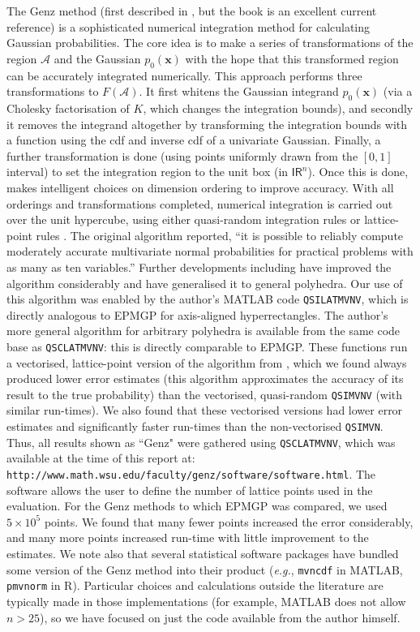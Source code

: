 \documentclass[twoside,11pt]{article}
\def\x{{\mathbf x}}
\def\regionA{\mathcal{A}}
\newcommand{\reals}{\mathsf{I\!R}}
\begin{document}
The Genz method (first described in \cite{genz92}, but the book \cite{genzBook} is an excellent current reference) is a sophisticated numerical integration
method for calculating Gaussian probabilities.
The core idea is to make a series of transformations of the region $\regionA$ and the Gaussian
$p_0(\x)$ with the hope that this transformed region can be accurately
integrated numerically. This approach performs three
transformations to $F(\regionA)$.  It first 
whitens the Gaussian integrand $p_0(\x)$ (via a Cholesky factorisation of
$K$, which changes the
integration bounds), and secondly it removes the integrand
altogether by transforming the integration bounds with a function
using the cdf and inverse cdf of a
univariate Gaussian.  Finally, a further transformation is done
(using points uniformly drawn from the $[0,1]$ interval) to
set the integration region to the unit box (in $\reals^n$).  Once this is
done, \cite{genz92} makes intelligent choices on dimension ordering
to improve accuracy.  With all orderings and
transformations completed, numerical integration is
carried out over the unit hypercube, using either quasi-random integration
rules \cite[]{nieder72,cranley76} or lattice-point rules
\cite[]{cranley76, nuyens04}.   The original algorithm
\cite[]{genz92} reported, ``it is possible to reliably compute
moderately accurate multivariate normal probabilities for practical
problems with as many as ten variables.'' Further developments
including \cite[]{genz99, genz99b, genz02, genz04} have improved the
algorithm considerably and have generalised it to general polyhedra.
Our use of this algorithm was enabled by the author's MATLAB code
{\tt QSILATMVNV}, which is directly analogous to EPMGP for axis-aligned hyperrectangles.  The author's more general algorithm for arbitrary polyhedra is available from the same code base as {\tt QSCLATMVNV}: this is directly comparable to EPMGP.  These functions run a vectorised,
lattice-point version of the algorithm from \cite[]{genz92}, which we found always
produced lower error estimates (this algorithm approximates the
accuracy of its result to the true probability) than the vectorised, quasi-random
{\tt QSIMVNV} (with similar run-times).  We also found that these vectorised versions
had lower error estimates and significantly faster run-times than
the non-vectorised {\tt QSIMVN}.  Thus, all results shown as ``Genz" were gathered using {\tt QSCLATMVNV}, which was available at the time of this
report at: {\tt
http://www.math.wsu.edu/faculty/genz/software/software.html}.  The
software allows the user to define the number of lattice points used
in the evaluation.  For the Genz methods to which EPMGP was compared, we used $5 \times 10^5$ points.  We
found that many fewer points increased the error
considerably, and many more points increased run-time with little
improvement to the estimates.  We
note also that several statistical software packages have bundled
some version of the Genz method into their product ({\it e.g.}, {\tt mvncdf}
in MATLAB, {\tt pmvnorm} in R).  Particular choices and calculations
outside the literature are typically made in those implementations
(for example, MATLAB does not allow $n>25$), so we have
focused on just the code available from the author himself.
\end{document}
